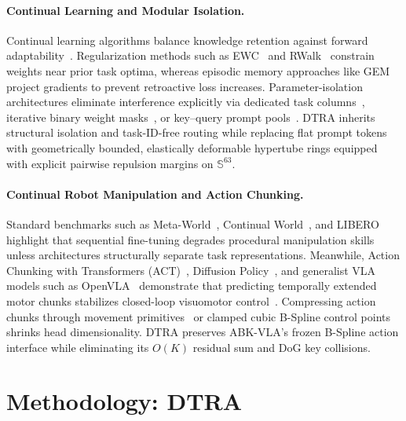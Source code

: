 \documentclass[10pt,twocolumn]{article}
\begin{document}
\paragraph{Continual Learning and Modular Isolation.}
Continual learning algorithms balance knowledge retention against forward adaptability~\cite{chaudhry2018riemannian}. Regularization methods such as EWC~\cite{kirkpatrick2017ewc} and RWalk~\cite{chaudhry2018riemannian} constrain weights near prior task optima, whereas episodic memory approaches like GEM~\cite{lopezpaz2017gem} project gradients to prevent retroactive loss increases. Parameter-isolation architectures eliminate interference explicitly via dedicated task columns~\cite{rusu2016progressive}, iterative binary weight masks~\cite{mallya2018packnet}, or key--query prompt pools~\cite{wang2022l2p}. DTRA inherits structural isolation and task-ID-free routing while replacing flat prompt tokens with geometrically bounded, elastically deformable hypertube rings equipped with explicit pairwise repulsion margins on $\mathbb{S}^{63}$.

\paragraph{Continual Robot Manipulation and Action Chunking.}
Standard benchmarks such as Meta-World~\cite{yu2020metaworld}, Continual World~\cite{wolczyk2021continualworld}, and LIBERO~\cite{liu2023libero} highlight that sequential fine-tuning degrades procedural manipulation skills unless architectures structurally separate task representations. Meanwhile, Action Chunking with Transformers (ACT)~\cite{zhao2023act}, Diffusion Policy~\cite{chi2023diffusion}, and generalist VLA models such as OpenVLA~\cite{kim2024openvla} demonstrate that predicting temporally extended motor chunks stabilizes closed-loop visuomotor control~\cite{levine2016visuomotor}. Compressing action chunks through movement primitives~\cite{paraschos2013promp} or clamped cubic B-Spline control points~\cite{son2026abkvla} shrinks head dimensionality. DTRA preserves ABK-VLA's frozen B-Spline action interface while eliminating its $O(K)$ residual sum and DoG key collisions.

\section{Methodology: DTRA}
\end{document}
